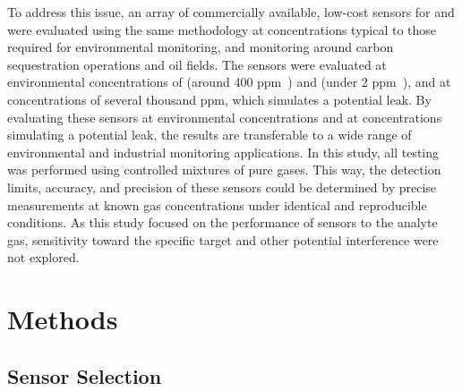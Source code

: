\documentclass[sensors,article,submit,moreauthors,pdftex]{Definitions/mdpi}
\begin{document}
		To address this issue, an array of commercially available, low-cost sensors for  and  were evaluated using the same methodology at concentrations typical to those required for environmental monitoring, and monitoring around carbon sequestration operations and oil fields.
		The sensors were evaluated at environmental concentrations of  (around 400 ppm~\cite{blasing_recent_2016,dlugokencky_trends_2016}) and  (under 2 ppm~\cite{turner_large_2016,bamberger_spatial_2014,dlugokencky_trends_2016-1}), and at concentrations of several thousand ppm, which simulates a potential leak.
		By evaluating these sensors at environmental concentrations and at concentrations simulating a potential leak, the results are transferable to a wide range of environmental and industrial monitoring applications.
		In this study, all testing was performed using controlled mixtures of pure gases.
		This way, the detection limits, accuracy, and precision of these sensors could be determined by precise measurements at known gas concentrations under identical and reproducible conditions.
		As this study focused on the performance of sensors to the analyte gas, sensitivity toward the specific target and other potential interference were not explored.
		
	\section{Methods}
		\label{sec:methods}
		
		\subsection{Sensor Selection}
		
\end{document}
